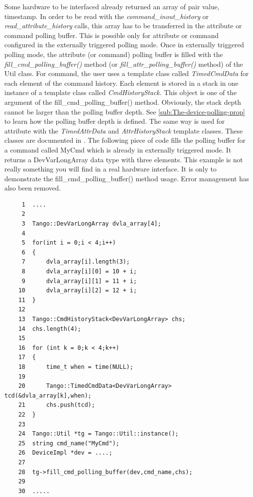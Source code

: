 Some hardware to be interfaced already returned an array of pair value,
timestamp. In order to be read with the \emph{command\_inout\_history}
or \emph{read\_attribute\_history} calls, this array has to be transferred
in the attribute or command polling buffer. This is possible only
for attribute or command configured in the externally triggered polling
mode. Once in externally triggered polling mode, the attribute (or
command) polling buffer is filled with the \emph{fill\_cmd\_polling\_buffer()}
method (or \emph{fill\_attr\_polling\_buffer()}
method) of the Util class. For command, the user uses a template class
called \emph{TimedCmdData} for each element of
the command history. Each element is stored in a stack in one instance
of a template class called \emph{CmdHistoryStack.}
This object is one of the argument of the fill\_cmd\_polling\_buffer()
method. Obviously, the stack depth cannot be larger than the polling
buffer depth. See \ref{sub:The-device-polling-prop} to learn how
the polling buffer depth is defined. The same way is used for attribute
with the \emph{TimedAttrData} and \emph{AttrHistoryStack}
template classes. These classes are documented in \cite{TANGO_ref_man}.
The following piece of code fills the polling buffer for a command
called MyCmd which is already in externally triggered mode. It returns
a DevVarLongArray data type with three elements. This example is not
really something you will find in a real hardware interface. It is
only to demonstrate the fill\_cmd\_polling\_buffer() method usage.
Error management has also been removed.


\begin{verbatim}
     1  ....
     2  
     3  Tango::DevVarLongArray dvla_array[4];
     4          
     5  for(int i = 0;i < 4;i++)
     6  {
     7      dvla_array[i].length(3);
     8      dvla_array[i][0] = 10 + i;
     9      dvla_array[i][1] = 11 + i;
    10      dvla_array[i][2] = 12 + i;
    11  }
    12  
    13  Tango::CmdHistoryStack<DevVarLongArray> chs;
    14  chs.length(4);
    15  
    16  for (int k = 0;k < 4;k++)
    17  {
    18      time_t when = time(NULL);
    19  
    20      Tango::TimedCmdData<DevVarLongArray> tcd(&dvla_array[k],when);
    21      chs.push(tcd);
    22  }
    23  
    24  Tango::Util *tg = Tango::Util::instance();
    25  string cmd_name("MyCmd");
    26  DeviceImpl *dev = ....;
    27  
    28  tg->fill_cmd_polling_buffer(dev,cmd_name,chs);
    29  
    30  .....

\end{verbatim}



